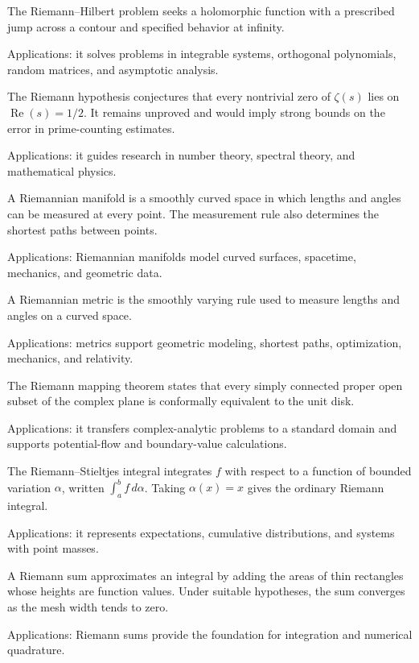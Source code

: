 The Riemann--Hilbert problem seeks a holomorphic function with a prescribed jump across a contour and specified behavior at infinity. \par\noindent Applications: it solves problems in integrable systems, orthogonal polynomials, random matrices, and asymptotic analysis.

The Riemann hypothesis conjectures that every nontrivial zero of $\zeta(s)$ lies on $\operatorname{Re}(s)=1/2$. It remains unproved and would imply strong bounds on the error in prime-counting estimates. \par\noindent Applications: it guides research in number theory, spectral theory, and mathematical physics.

A Riemannian manifold is a smoothly curved space in which lengths and angles can be measured at every point. The measurement rule also determines the shortest paths between points. \par\noindent Applications: Riemannian manifolds model curved surfaces, spacetime, mechanics, and geometric data.

A Riemannian metric is the smoothly varying rule used to measure lengths and angles on a curved space. \par\noindent Applications: metrics support geometric modeling, shortest paths, optimization, mechanics, and relativity.

The Riemann mapping theorem states that every simply connected proper open subset of the complex plane is conformally equivalent to the unit disk. \par\noindent Applications: it transfers complex-analytic problems to a standard domain and supports potential-flow and boundary-value calculations.

The Riemann--Stieltjes integral integrates $f$ with respect to a function of bounded variation $\alpha$, written $\int_a^b f\,d\alpha$. Taking $\alpha(x)=x$ gives the ordinary Riemann integral. \par\noindent Applications: it represents expectations, cumulative distributions, and systems with point masses.

A Riemann sum approximates an integral by adding the areas of thin rectangles whose heights are function values. Under suitable hypotheses, the sum converges as the mesh width tends to zero. \par\noindent Applications: Riemann sums provide the foundation for integration and numerical quadrature.

